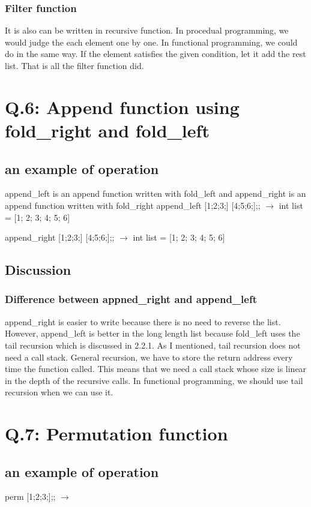 \documentclass[uplatex,12pt]{jsarticle}
\begin{document}
\subsubsection{Filter function}
It is also can be written in recursive function. In procedual programming, we would judge the each element one by one. In functional programming, we could do in the same way. If the element satisfies the given condition, let it add the rest list. That is all the filter function did.



\section {Q.6: Append function using fold\_right and fold\_left}

\subsection {an example of operation}
append\_left is an append function written with fold\_left and append\_right is an append function written with fold\_right
append\_left [1;2;3;] [4;5;6;];; $\rightarrow$ int list = [1; 2; 3; 4; 5; 6]

append\_right [1;2;3;] [4;5;6;];; $\rightarrow$ int list = [1; 2; 3; 4; 5; 6]

\subsection{Discussion}
\subsubsection{Difference between appned\_right and append\_left}
append\_right is easier to write because there is no need to reverse the list. However, append\_left is better in the long length list because fold\_left uses the tail recursion which is discussed in 2.2.1. As I mentioned, tail recursion does not need a call stack. General recursion, we have to store the return address every time the function called. This means that we need a call stack whose size is linear in the depth of the recursive calls. In functional programming, we should use tail recursion when we can use it.


\section {Q.7: Permutation function}

\subsection{an example of operation}
perm [1;2;3;];; $\rightarrow$
\end{document}
